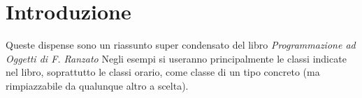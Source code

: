 \chapter{Introduzione}
Queste dispense sono un riassunto super condensato del libro \textit{Programmazione ad Oggetti di F. Ranzato}
Negli esempi si useranno principalmente le classi indicate nel libro, soprattutto le classi orario, come classe di un tipo concreto (ma rimpiazzabile da qualunque altro a scelta). 